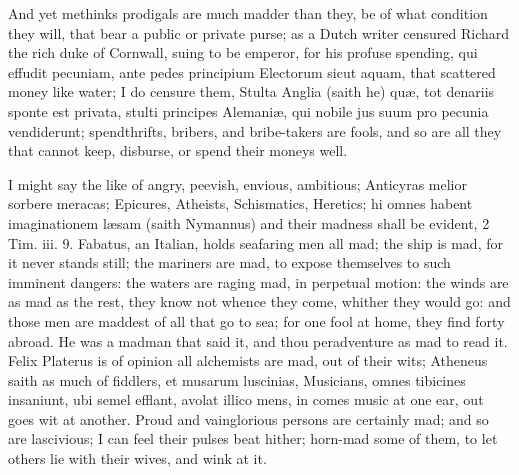 {And yet methinks prodigals are much madder than they, be of what
condition they will, that bear a public or private purse; as a
Dutch writer censured Richard the rich duke of Cornwall, suing to
be emperor, for his profuse spending, qui effudit pecuniam, ante pedes
principium Electorum sicut aquam, that scattered money like water; I do
censure them, Stulta Anglia (saith he) qu\ae{}, tot denariis sponte est
privata, stulti principes Alemani\ae{}, qui nobile jus suum pro pecunia
vendiderunt; spendthrifts, bribers, and bribe-takers are fools, and so
are all they that cannot keep, disburse, or spend their moneys
well.

I might say the like of angry, peevish, envious, ambitious; 
Anticyras melior sorbere meracas; Epicures, Atheists, Schismatics,
Heretics; hi omnes habent imaginationem l\ae{}sam (saith Nymannus) and
their madness shall be evident, 2 Tim. iii. 9. Fabatus, an
Italian, holds seafaring men all mad; the ship is mad, for it never
stands still; the mariners are mad, to expose themselves to such
imminent dangers: the waters are raging mad, in perpetual motion: the
winds are as mad as the rest, they know not whence they come, whither
they would go: and those men are maddest of all that go to sea; for one
fool at home, they find forty abroad. He was a madman that said it, and
thou peradventure as mad to read it.  Felix Platerus is of opinion
all alchemists are mad, out of their wits; Atheneus saith as much
of fiddlers, et musarum luscinias,  Musicians, omnes tibicines
insaniunt, ubi semel efflant, avolat illico mens, in comes music at one
ear, out goes wit at another. Proud and vainglorious persons are
certainly mad; and so are lascivious; I can feel their pulses beat
hither; horn-mad some of them, to let others lie with their wives, and
wink at it.

}
